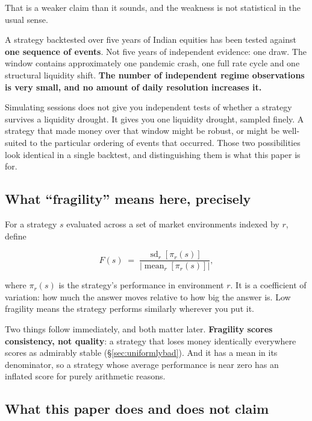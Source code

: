 \documentclass[11pt,a4paper]{article}
\begin{document}
That is a weaker claim than it sounds, and the weakness is not statistical in the usual sense.

\begin{finding}
A strategy backtested over five years of Indian equities has been tested against
\textbf{one sequence of events}. Not five years of independent evidence: one draw. The window
contains approximately one pandemic crash, one full rate cycle and one structural liquidity shift.
\textbf{The number of independent regime observations is very small, and no amount of daily
resolution increases it.}
\end{finding}

Simulating \rsCrrSessions{} sessions does not give you \rsCrrSessions{} independent tests of
whether a strategy
survives a liquidity drought. It gives you one liquidity drought, sampled finely. A strategy that
made money over that window might be robust, or might be well-suited to the particular ordering of
events that occurred. Those two possibilities look identical in a single backtest, and
distinguishing them is what this paper is for.

\subsection{What ``fragility'' means here, precisely}

For a strategy $s$ evaluated across a set of market environments indexed by $r$, define

\[
F(s) \;=\; \frac{\operatorname{sd}_r\!\left[\pi_r(s)\right]}{\left|\operatorname{mean}_r\!\left[\pi_r(s)\right]\right|},
\]

where $\pi_r(s)$ is the strategy's performance in environment $r$. It is a coefficient of
variation: how much the answer moves relative to how big the answer is. Low fragility means the
strategy performs similarly wherever you put it.

Two things follow immediately, and both matter later. \textbf{Fragility scores consistency, not
quality}: a strategy that loses money identically everywhere scores as admirably stable
(\S\ref{sec:uniformlybad}). And it has a mean in its denominator, so a strategy whose average
performance is near zero has an inflated score for purely arithmetic reasons.

\subsection{What this paper does and does not claim}
\end{document}
